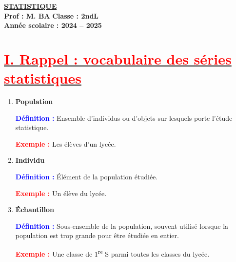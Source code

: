 \documentclass[a4paper,12pt]{article}
\begin{document}
\small

\begin{center}
    \Large\textbf{\underline{STATISTIQUE}}\\[-0.1cm]
    \normalsize\textbf{Prof : M. BA} \hfill \textbf{Classe : 2ndL}\\[-0.1cm]
    \textbf{Année scolaire : 2024 -- 2025}
\end{center}

\section*{\underline{\textcolor{red}{I. Rappel : vocabulaire des séries statistiques}}}

\begin{enumerate}[leftmargin=1.5cm, label=\textbf{\arabic*)}]
    
    \item \textbf{Population} \\
    \begin{tcolorbox}[colback=red!5!white, colframe=red!60!black, boxrule=0.5pt]
        \textcolor{blue}{\textbf{Définition :}} Ensemble d’individus ou d’objets sur lesquels porte l’étude statistique.
    \end{tcolorbox}
    \begin{tcolorbox}[colback=blue!5!white, colframe=blue!50!black, boxrule=0.5pt]
        \textcolor{red}{\textbf{Exemple :}} Les élèves d’un lycée.
    \end{tcolorbox}
    
    \item \textbf{Individu} \\
    \begin{tcolorbox}[colback=red!5!white, colframe=red!60!black, boxrule=0.5pt]
        \textcolor{blue}{\textbf{Définition :}} Élément de la population étudiée.
    \end{tcolorbox}
    \begin{tcolorbox}[colback=blue!5!white, colframe=blue!50!black, boxrule=0.5pt]
        \textcolor{red}{\textbf{Exemple :}} Un élève du lycée.
    \end{tcolorbox}
    
    \item \textbf{Échantillon} \\
    \begin{tcolorbox}[colback=red!5!white, colframe=red!60!black, boxrule=0.5pt]
        \textcolor{blue}{\textbf{Définition :}} Sous-ensemble de la population, souvent utilisé lorsque la population est trop grande pour être étudiée en entier.
    \end{tcolorbox}
    \begin{tcolorbox}[colback=blue!5!white, colframe=blue!50!black, boxrule=0.5pt]
        \textcolor{red}{\textbf{Exemple :}} Une classe de 1\textsuperscript{re} S parmi toutes les classes du lycée.
    \end{tcolorbox}
    

\end{enumerate}
\end{document}
